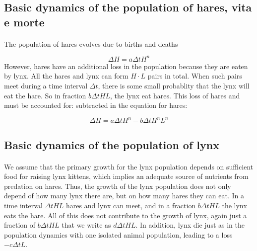 \documentclass[%
oneside,                 %
final,                   %
10pt]{article}
\begin{document}
\noindent



\subsection{Basic dynamics of the population of hares, vita e morte}


\paragraph{}
The population of hares evolves due to births and deaths

\[
\Delta H = a \Delta t H^n
\]
However, hares have an additional loss in the population because
they are eaten by lynx.
All the hares and lynx can form
$H\cdot L$ pairs in total. When such pairs meet during a time
interval $\Delta t$, there is some
small probablity that the lynx will eat the hare.
So in fraction $b\Delta t HL$, the lynx eat hares. This
loss of hares and must be accounted for:
subtracted in the equation for hares:

\[ \Delta H = a\Delta t H^n - b \Delta t H^nL^n\]



\subsection{Basic dynamics of the population of lynx}


\paragraph{}
We assume that the primary growth for the lynx population depends on sufficient food for raising lynx kittens, which implies an adequate source of nutrients from predation on hares. Thus, the growth of the lynx population does not only depend of how many lynx there are, but on how many hares they can eat.
In a time interval $\Delta t HL$ hares and lynx can meet, and in a
fraction $b\Delta t HL$ the lynx eats the hare. All of this does not
contribute to the growth of lynx, again just a fraction of
$b\Delta t HL$ that we write as
$d\Delta t HL$. In addition, lynx die just as in the population
dynamics with one isolated animal population, leading to a loss
$-c\Delta t L$.
\end{document}
